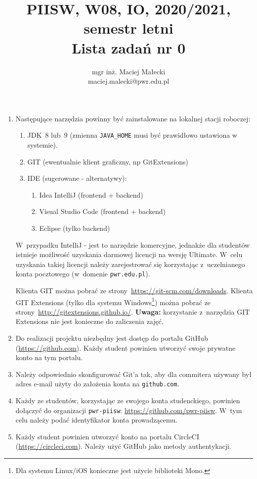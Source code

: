 \documentclass[12pt]{article}
\title{PIISW, W08, IO, 2020/2021, semestr letni\\Lista zadań nr 0}
\author{mgr inż. Maciej Małecki\\\small{maciej.malecki@pwr.edu.pl}}
\begin{document}
    \maketitle

    \begin{enumerate}
        \item Następujące narzędzia powinny być zainstalowane na lokalnej stacji roboczej:
            \begin{enumerate}
                \item JDK~8 lub~9 (zmienna \texttt{JAVA\_HOME} musi być prawidłowo ustawiona w systemie).
                \item GIT (ewentualnie klient graficzny, np GitExtensions)
                \item IDE (sugerowane - alternatywy):
                    \begin{enumerate}
                        \item Idea IntelliJ (frontend + backend)
                        \item Visual Studio Code (frontend + backend)
                        \item Eclipse (tylko backend)
                    \end{enumerate}
            \end{enumerate}
            
            W~przypadku IntelliJ - jest to narzędzie komercyjne, jednakże dla studentów istnieje możliwość uzyskania darmowej licencji na wersję Ultimate. W~celu uzyskania takiej licencji należy zarejestrować się korzystając z~uczelnianego konta pocztowego (w~domenie \texttt{pwr.edu.pl}).

            Klienta GIT można pobrać ze strony~\url{https://git-scm.com/downloads}. Klienta GIT Extensions (tylko dla systemu Windows\footnote{Dla systemu Linux/iOS konieczne jest użycie biblioteki Mono.}) można pobrać ze strony~\url{http://gitextensions.github.io/}. \textbf{Uwaga:} korzystanie z~narzędzia GIT Extensions nie jest konieczne do zaliczenia zajęć.

        \item Do realizacji projektu niezbędny jest dostęp do portalu GitHub (\url{https://github.com}). Każdy student powinien utworzyć swoje prywatne konto na tym portalu.

        \item Należy odpowiednio skonfigurować Git’a tak, aby dla commitera używany był adres e-mail użyty do założenia konta na \texttt{github.com}.

        \item Każdy ze studentów, korzystając ze swojego konta studenckiego, powinien dołączyć do organizacji \texttt{pwr-piisw}: \url{https://github.com/pwr-piisw}. W~tym celu należy podać identyfikator konta prowadzącemu.

        \item Każdy student powinien utworzyć konto na portalu CircleCI (\url{https://circleci.com}). Należy użyć GitHub jako metody authentykacji.
    \end{enumerate}
\end{document}
